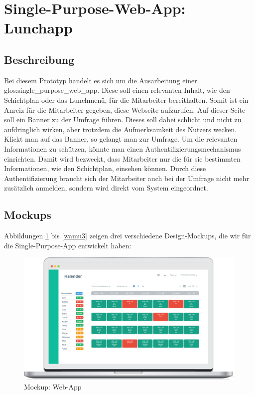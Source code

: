 \section{Single-Purpose-Web-App: Lunchapp}
\label{section:lunchapp}

\subsection{Beschreibung}


Bei diesem Prototyp handelt es sich um die Ausarbeitung einer \gls{glos:single_purpose_web_app}. Diese soll einen relevanten Inhalt, wie den Schichtplan oder das Lunchmenü, für die Mitarbeiter bereithalten. Somit ist ein Anreiz für die Mitarbeiter gegeben, diese Webseite aufzurufen. Auf dieser Seite soll ein Banner zu der Umfrage führen. Dieses soll dabei schlicht und nicht zu aufdringlich wirken, aber trotzdem die Aufmerksamkeit des Nutzers wecken. Klickt man auf das Banner, so gelangt man zur Umfrage. Um die relevanten Informationen zu schützen, könnte man einen Authentifizierungsmechanismus einrichten. Damit wird bezweckt, dass Mitarbeiter nur die für sie bestimmten Informationen, wie den Schichtplan, einsehen können. Durch diese Authentifizierung braucht sich der Mitarbeiter auch bei der Umfrage nicht mehr zusätzlich anmelden, sondern wird direkt vom System eingeordnet.

\subsection{Mockups}

Abbildungen \ref{wamu1} bis \ref{wamu3} zeigen drei verschiedene Design-Mockups, die wir für die Single-Purpose-App entwickelt haben:

\begin{figure}[H] 
\centering 
\includegraphics[scale=0.72]{images/lunchapp_mockups/mockup1} 
\caption[Mockup: Web-App]{Mockup: Web-App} 
\label{wamu1} 
\end{figure}

